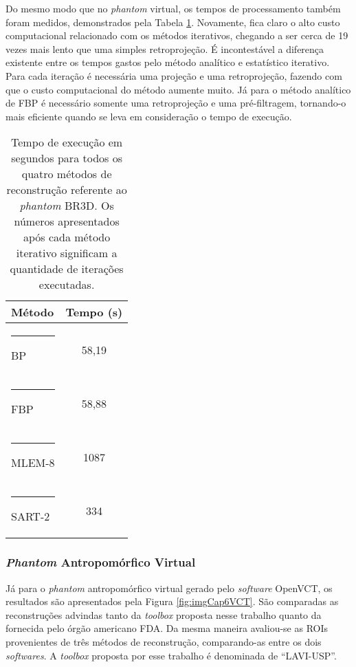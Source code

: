 Do mesmo modo que no \textit{phantom} virtual, os tempos de processamento também foram medidos, demonstrados pela Tabela \ref{tab:tabCap6TimeBR3D}. Novamente, fica claro o alto custo computacional relacionado com os métodos iterativos, chegando  a ser cerca de 19 vezes mais lento que uma simples retroprojeção.  É incontestável a diferença existente entre os tempos gastos pelo método analítico e estatístico iterativo. Para cada iteração é necessária uma projeção e uma retroprojeção, fazendo com que o custo computacional do método aumente muito. Já para o método analítico de \acs{FBP} é necessário somente uma retroprojeção e uma pré-filtragem, tornando-o mais eficiente quando se leva em consideração o tempo de execução.

\begin{table}[!ht]
	\centering
	\caption{Tempo de execução em segundos para todos os quatro métodos de reconstrução referente ao \textit{phantom} BR3D. Os números apresentados após cada método iterativo significam a quantidade de iterações executadas.}
	\label{tab:tabCap6TimeBR3D}
	\begin{tabular}{l|c}
		\textbf{Método}	     &   \textbf{Tempo (s)}   	\\ 
		[5pt]
		\hline
		\hline
		\rule[-0.5ex]{-3pt}{3ex}
		BP 	 		 						& 58,19					\\ 
		\hline
		\rule[-0.5ex]{-3pt}{3ex}
		FBP			 						& 58,88					\\
		\hline
		\rule[-0.5ex]{-3pt}{3ex}
		MLEM-8		 					& 1087 					\\
		\hline
		\rule[-0.5ex]{-3pt}{3ex}
		SART-2		 					& 334 					\\
		\hline
	\end{tabular}
	\vspace{2ex}
\end{table}


\subsubsection{\textit{Phantom} Antropomórfico Virtual}
 
 Já para o \textit{phantom} antropomórfico virtual gerado pelo \textit{software} OpenVCT, os resultados são apresentados pela Figura \ref{fig:imgCap6VCT}. São comparadas as reconstruções advindas tanto da \textit{toolbox} proposta nesse trabalho quanto da fornecida pelo órgão americano \acs{FDA}. Da mesma maneira avaliou-se as \acs{ROI}s provenientes de três métodos de reconstrução, comparando-as entre os dois \textit{softwares}. A \textit{toolbox} proposta por esse trabalho é denominada de ``LAVI-USP''.
 
